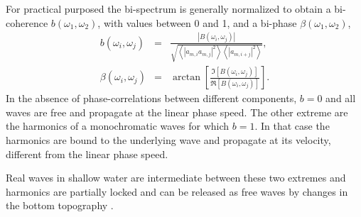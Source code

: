 For practical purposed the bi-spectrum is generally normalized to obtain a bi-coherence $b(\omega_1,\omega_2)$, with values between 0 and 1, 
and a bi-phase $\beta(\omega_1,\omega_2)$, 
\begin{eqnarray}
b(\omega_i,\omega_j)& =&\frac{\left|B(\omega_i,\omega_j)\right|}{\sqrt{ \left\langle  \left|a_{m,i} a_{m,j}\right|^2 \right\rangle 
                             \left\langle \left|a_{m,i+j}\right|^2   \right\rangle}}, \\
 \beta(\omega_i,\omega_j) &=&\arctan \left[\frac{\Im[     B(\omega_i,\omega_j)]}{\Re[     B(\omega_i,\omega_j)]} \right].
\end{eqnarray}
In the absence of phase-correlations between different components, $b=0$ and all waves are free and propagate at the linear phase speed.  
The other extreme are the harmonics of a monochromatic waves for which $b=1$. In that case the harmonics are bound to the underlying wave and propagate at its velocity, different from the linear phase speed. 

Real waves in shallow water are intermediate between these two extremes and harmonics are partially locked and can be released as free waves by changes in the bottom topography \citep[e.g.][]{Senechal&al.2003}.

